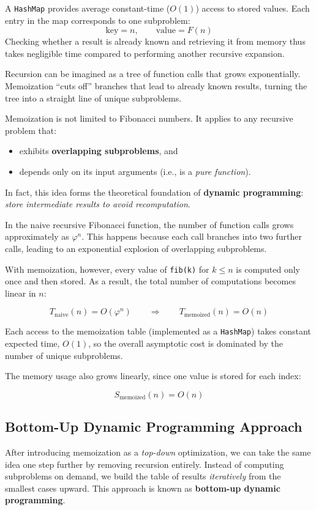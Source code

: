 \documentclass{article}
\begin{document}
A \texttt{HashMap} provides average constant-time ($O(1)$) access to stored values.
Each entry in the map corresponds to one subproblem:
\[
	\text{key} = n, \qquad \text{value} = F(n)
\]
Checking whether a result is already known and retrieving it from memory thus takes negligible time compared to performing another recursive expansion.

Recursion can be imagined as a tree of function calls that grows exponentially.
Memoization ``cuts off'' branches that lead to already known results,
turning the tree into a straight line of unique subproblems.

Memoization is not limited to Fibonacci numbers.
It applies to any recursive problem that:
\begin{itemize}
	\item exhibits \textbf{overlapping subproblems}, and
	\item depends only on its input arguments (i.e., is a \emph{pure function}).
\end{itemize}

In fact, this idea forms the theoretical foundation of \textbf{dynamic programming}:
\emph{store intermediate results to avoid recomputation}.


In the naive recursive Fibonacci function, the number of function calls grows approximately as $\varphi^n$.
This happens because each call branches into two further calls, leading to an exponential explosion of overlapping subproblems.

With memoization, however, every value of \texttt{fib(k)} for $k \le n$ is computed only once and then stored.
As a result, the total number of computations becomes linear in $n$:

\[
	T_{\text{naive}}(n) = O(\varphi^n)
	\qquad \Longrightarrow \qquad
	T_{\text{memoized}}(n) = O(n)
\]

Each access to the memoization table (implemented as a \texttt{HashMap}) takes constant expected time, $O(1)$,
so the overall asymptotic cost is dominated by the number of unique subproblems.

The memory usage also grows linearly, since one value is stored for each index:

\[
	S_{\text{memoized}}(n) = O(n)
\]

\subsection{Bottom-Up Dynamic Programming Approach}
After introducing memoization as a \emph{top-down} optimization,
we can take the same idea one step further by removing recursion entirely.
Instead of computing subproblems on demand, we build the table of results
\emph{iteratively} from the smallest cases upward.
This approach is known as \textbf{bottom-up dynamic programming}.
\end{document}
